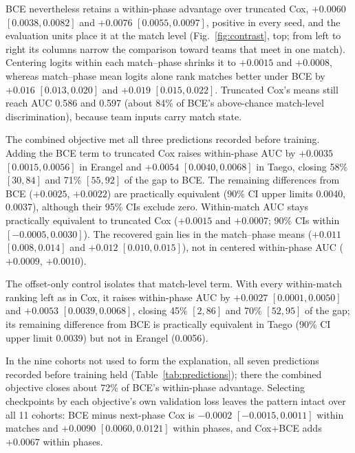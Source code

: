 \documentclass[sigconf,anonymous,nonacm]{acmart}
\begin{document}
BCE nevertheless retains a within-phase advantage over truncated Cox, $+0.0060$ $[0.0038,\allowbreak 0.0082]$ and $+0.0076$ $[0.0055,\allowbreak 0.0097]$, positive in every seed, and the evaluation units place it at the match level (Fig.~\ref{fig:contrast}, top; from left to right its columns narrow the comparison toward teams that meet in one match). Centering logits within each match--phase shrinks it to $+0.0015$ and $+0.0008$, whereas match--phase mean logits alone rank matches better under BCE by $+0.016$ $[0.013,\allowbreak 0.020]$ and $+0.019$ $[0.015,\allowbreak 0.022]$. Truncated Cox's means still reach AUC 0.586 and 0.597 (about 84\% of BCE's above-chance match-level discrimination), because team inputs carry match state.

The combined objective met all three predictions recorded before training. Adding the BCE term to truncated Cox raises within-phase AUC by $+0.0035$ $[0.0015,\allowbreak 0.0056]$ in Erangel and $+0.0054$ $[0.0040,\allowbreak 0.0068]$ in Taego, closing 58\% $[30,\allowbreak 84]$ and 71\% $[55,\allowbreak 92]$ of the gap to BCE. The remaining differences from BCE ($+0.0025$, $+0.0022$) are practically equivalent (90\% CI upper limits 0.0040, 0.0037), although their 95\% CIs exclude zero. Within-match AUC stays practically equivalent to truncated Cox ($+0.0015$ and $+0.0007$; 90\% CIs within $[-0.0005,\allowbreak 0.0030]$). The recovered gain lies in the match--phase means ($+0.011$ $[0.008,\allowbreak 0.014]$ and $+0.012$ $[0.010,\allowbreak 0.015]$), not in centered within-phase AUC ($+0.0009$, $+0.0010$).

The offset-only control isolates that match-level term. With every within-match ranking left as in Cox, it raises within-phase AUC by $+0.0027$ $[0.0001,\allowbreak 0.0050]$ and $+0.0053$ $[0.0039,\allowbreak 0.0068]$, closing 45\% $[2,\allowbreak 86]$ and 70\% $[52,\allowbreak 95]$ of the gap; its remaining difference from BCE is practically equivalent in Taego (90\% CI upper limit 0.0039) but not in Erangel (0.0056).


In the nine cohorts not used to form the explanation, all seven predictions recorded before training held (Table~\ref{tab:predictions}); there the combined objective closes about 72\% of BCE's within-phase advantage. Selecting checkpoints by each objective's own validation loss leaves the pattern intact over all 11 cohorts: BCE minus next-phase Cox is $-0.0002$ $[-0.0015,\allowbreak 0.0011]$ within matches and $+0.0090$ $[0.0060,\allowbreak 0.0121]$ within phases, and Cox+BCE adds $+0.0067$ within phases.
\end{document}
